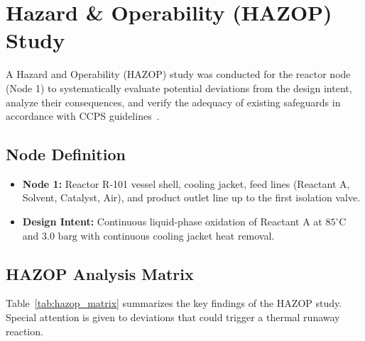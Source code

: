 \section{Hazard \& Operability (HAZOP) Study}
\label{sec:hazop}

A Hazard and Operability (HAZOP) study was conducted for the reactor node (Node 1) to systematically evaluate potential deviations from the design intent, analyze their consequences, and verify the adequacy of existing safeguards in accordance with CCPS guidelines~\cite{ccps2010}.

\subsection{Node Definition}
\begin{itemize}
    \item \textbf{Node 1:} Reactor R-101 vessel shell, cooling jacket, feed lines (Reactant A, Solvent, Catalyst, Air), and product outlet line up to the first isolation valve.
    \item \textbf{Design Intent:} Continuous liquid-phase oxidation of Reactant A at $85^\circ\text{C}$ and $3.0 \text{ barg}$ with continuous cooling jacket heat removal.
\end{itemize}

\subsection{HAZOP Analysis Matrix}
Table~\ref{tab:hazop_matrix} summarizes the key findings of the HAZOP study. Special attention is given to deviations that could trigger a thermal runaway reaction.


